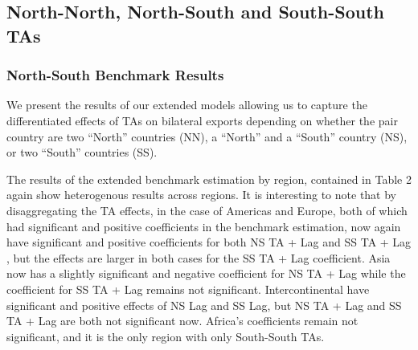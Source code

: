 \documentclass[12pt]{article}%
\begin{document}
%
\FloatBarrier

%
\subsection{North{-}North, North{-}South and South{-}South TAs}%
\label{subsec:North{-}North,North{-}SouthandSouth{-}SouthTAs}%
\subsubsection{North{-}South Benchmark Results}%
\label{ssubsec:North{-}SouthBenchmarkResults}%
We present the results of our extended models allowing us to capture the
differentiated effects of TAs on bilateral exports depending on whether
the pair country are two ``North'' countries (NN), a ``North'' and a
``South'' country (NS), or two ``South'' countries (SS).

The results of the extended benchmark estimation by region, contained in
Table 2 again show heterogenous results across regions. It is
interesting to note that by disaggregating the TA effects, in the case
of Americas and Europe, both of which had significant and positive
coefficients in the benchmark estimation, now again have significant and
positive coefficients for both NS TA + Lag and SS TA + Lag , but the
effects are larger in both cases for the SS TA + Lag coefficient. Asia
now has a slightly significant and negative coefficient for NS TA + Lag
while the coefficient for SS TA + Lag remains not significant.
Intercontinental have significant and positive effects of NS Lag and SS
Lag, but NS TA + Lag and SS TA + Lag are both not significant now.
Africa's coefficients remain not significant, and it is the only region
with only South-South TAs.
%
%
\FloatBarrier

%
\end{document}
